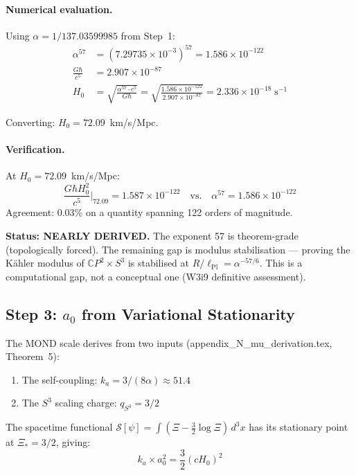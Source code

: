 \documentclass[12pt,a4paper]{article}
\newcommand{\CP}{\mathbb{C}P}
\newcommand{\Hzero}{H_0}
\newcommand{\ee}[1]{\times 10^{#1}}
\begin{document}
\paragraph{Numerical evaluation.}
Using $\alpha = 1/137.03599985$ from Step~1:
\begin{align}
\alpha^{57} &= (7.29735 \ee{-3})^{57} = 1.586 \ee{-122} \\
\frac{G\hbar}{c^5} &= 2.907 \ee{-87} \\
\Hzero &= \sqrt{\frac{\alpha^{57} \cdot c^5}{G\hbar}}
= \sqrt{\frac{1.586 \ee{-122}}{2.907 \ee{-87}}}
= 2.336 \ee{-18}\;\mathrm{s}^{-1}
\end{align}

Converting: $\Hzero = 72.09$~km/s/Mpc.

\paragraph{Verification.}
At $\Hzero = 72.09$~km/s/Mpc:
\begin{equation}
\frac{G\hbar\Hzero^2}{c^5}\bigg|_{72.09}
= 1.587 \ee{-122}
\quad\text{vs.}\quad
\alpha^{57} = 1.586 \ee{-122}
\end{equation}
Agreement: $0.03\%$ on a quantity spanning 122 orders of magnitude.

\textbf{Status: NEARLY DERIVED.} The exponent 57 is theorem-grade
(topologically forced). The remaining gap is modulus stabilisation ---
proving the K\"ahler modulus of $\CP^2 \times S^3$ is stabilised at
$R/\ell_{\mathrm{Pl}} = \alpha^{-57/6}$. This is a computational gap,
not a conceptual one (W3i9 definitive assessment).

\subsection{Step 3: $a_0$ from Variational Stationarity}

The MOND scale derives from two inputs (appendix\_N\_mu\_derivation.tex,
Theorem~5):
\begin{enumerate}
\item The self-coupling: $k_a = 3/(8\alpha) \approx 51.4$
\item The $S^3$ scaling charge: $q_{S^3} = 3/2$
\end{enumerate}

The spacetime functional $\mathcal{S}[\psi] = \int(\Xi - \frac{3}{2}\log\Xi)\,d^3x$
has its stationary point at $\Xi_* = 3/2$, giving:
\begin{equation}
k_a \times a_0^2 = \frac{3}{2}(c\Hzero)^2
\end{equation}
\end{document}
